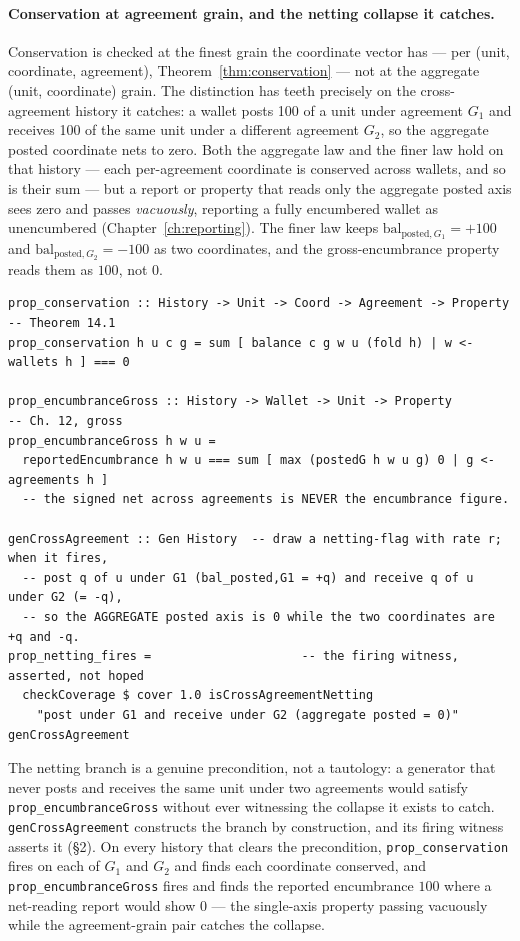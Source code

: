 \paragraph{Conservation at agreement grain, and the netting collapse it catches.}
Conservation is checked at the finest grain the coordinate vector has --- per (unit,
coordinate, agreement), Theorem~\ref{thm:conservation} --- not at the aggregate (unit,
coordinate) grain. The distinction has teeth precisely on the cross-agreement history it
catches: a wallet posts 100 of a unit under agreement $G_1$ and receives 100 of the
same unit under a different agreement $G_2$, so the aggregate posted coordinate nets to
zero. Both the aggregate law and the finer law hold on that history --- each per-agreement
coordinate is conserved across wallets, and so is their sum --- but a report or property
that reads only the aggregate posted axis sees zero and passes \emph{vacuously}, reporting
a fully encumbered wallet as unencumbered (Chapter~\ref{ch:reporting}). The finer law keeps
$\mathrm{bal}_{\text{posted},G_1}=+100$ and $\mathrm{bal}_{\text{posted},G_2}=-100$ as two
coordinates, and the gross-encumbrance property reads them as $100$, not $0$.

\begin{lstlisting}
prop_conservation :: History -> Unit -> Coord -> Agreement -> Property  -- Theorem 14.1
prop_conservation h u c g = sum [ balance c g w u (fold h) | w <- wallets h ] === 0

prop_encumbranceGross :: History -> Wallet -> Unit -> Property          -- Ch. 12, gross
prop_encumbranceGross h w u =
  reportedEncumbrance h w u === sum [ max (postedG h w u g) 0 | g <- agreements h ]
  -- the signed net across agreements is NEVER the encumbrance figure.

genCrossAgreement :: Gen History  -- draw a netting-flag with rate r; when it fires,
  -- post q of u under G1 (bal_posted,G1 = +q) and receive q of u under G2 (= -q),
  -- so the AGGREGATE posted axis is 0 while the two coordinates are +q and -q.
prop_netting_fires =                     -- the firing witness, asserted, not hoped
  checkCoverage $ cover 1.0 isCrossAgreementNetting
    "post under G1 and receive under G2 (aggregate posted = 0)" genCrossAgreement
\end{lstlisting}

The netting branch is a genuine precondition, not a tautology: a generator that never posts
and receives the same unit under two agreements would satisfy \texttt{prop\_encumbranceGross}
without ever witnessing the collapse it exists to catch. \texttt{genCrossAgreement} constructs
the branch by construction, and its firing witness asserts it (\S 2). On every history that
clears the precondition, \texttt{prop\_conservation} fires on each of $G_1$ and $G_2$ and
finds each coordinate conserved, and \texttt{prop\_encumbranceGross} fires and finds the
reported encumbrance $100$ where a net-reading report would show $0$ --- the single-axis
property passing vacuously while the agreement-grain pair catches the collapse.

